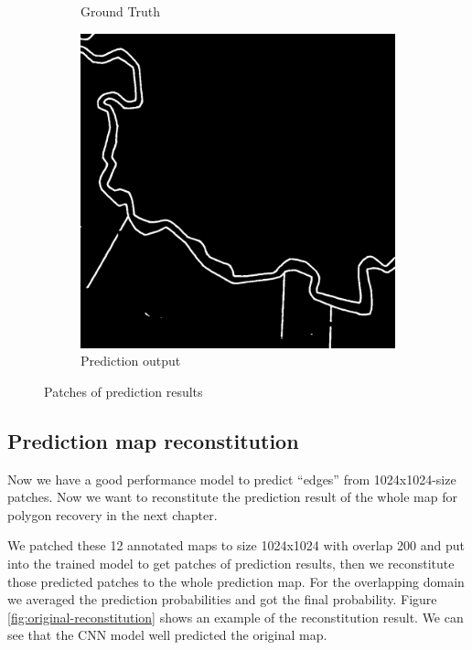 \documentclass[12pt]{article}
\begin{document}
\begin{figure}[H]
\begin{subfigure}[b]{.28\textwidth}
\begin{minipage}[t]{1\linewidth}
			\caption{Ground Truth}
		\end{minipage}
	\end{subfigure}
	\begin{subfigure}[b]{.28\textwidth}
		\begin{minipage}[t]{1\linewidth}
			\centering
			\includegraphics[width=1\linewidth]{images/patches/pre10.png}
		    \caption{Prediction output}
		\end{minipage}
	\end{subfigure}
	
    \caption{Patches of prediction results}
    \label{fig:pre_res}
\end{figure}



\subsection{Prediction map reconstitution}
Now we have a good performance model to predict “edges” from 1024x1024-size patches. Now we want to reconstitute the prediction result of the whole map for polygon recovery in the next chapter.

We patched these 12 annotated maps to size 1024x1024 with overlap 200 and put into the trained model to get patches of prediction results, then we reconstitute those predicted patches to the whole prediction map. For the overlapping domain we averaged the prediction probabilities and got the final probability. Figure \ref{fig:original-reconstitution} shows an example of the reconstitution result. We can see that the CNN model well predicted the original map.
\end{document}
